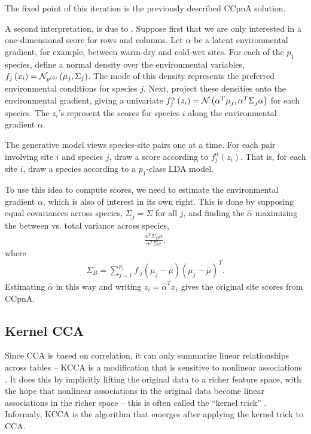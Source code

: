 \documentclass[14pt]{extarticle}
\begin{document}
The fixed point of this iteration is the previously described CCpnA solution.

A second interpretation, is due to \citep{zhu2005constrained}. Suppose first
that we are only interested in a one-dimensional score for rows and columns. Let
$\alpha$ be a latent environmental gradient, for example, between warm-dry and
cold-wet sites. For each of the $p_{1}$ species, define a normal density over
the environmental variables, $f_{j}\left(x_{i}\right) =
\mathcal{N}_{p^{(2)}}\left(\mu_{j}, \Sigma_{j}\right)$. The mode of this density
represents the preferred environmental conditions for species $j$. Next, project
these densities onto the environmental gradient, giving a univariate
$f_{j}^{\alpha}\left(z_{i}\right) = \mathcal{N}\left(\alpha^{T}\mu_{j}, \alpha^{T}
\Sigma_{j}\alpha\right)$ for each species. The $z_{i}$'s represent the scores
for species $i$ along the environmental gradient $\alpha$.

The generative model views species-site pairs one at a time. For each pair
involving site $i$ and species $j$, draw a score according to
$f_{j}^{\alpha}\left(z_{i}\right)$. That is, for each site $i$, draw a species
according to a $p_{1}$-class LDA model.

To use this idea to compute scores, we need to estimate the environmental
gradient $\alpha$, which is also of interest in its own right. This is done by
supposing equal covariances across species, $\Sigma_{j} = \Sigma$ for all $j$,
and finding the $\hat{\alpha}$ maximizing the between vs. total variance across
species,
\begin{align*}
  \frac{\alpha^{T} \Sigma_{B} \alpha}{\alpha^{T} \Sigma \alpha},
\end{align*}
where
\begin{align*}
  \Sigma_{B} = \sum_{j = 1}^{p_{1}} f_{\cdot j}\left(\mu_{j} -
    \bar{\mu}\right)\left(\mu_{j} - \bar{\mu}\right)^{T}.
\end{align*}
Estimating $\hat{\alpha}$ in this way and writing $z_{i} =
\hat{\alpha}^{T}x_{i}$ gives the original site scores from CCpnA.

\subsection{Kernel CCA}
\label{subsec:kernel_cca}

Since CCA is based on correlation, it can only summarize linear relationships
across tables -- KCCA is a modification that is sensitive to nonlinear
associations \citep{akaho2006kernel, bach2003kernel, lanckriet2004statistical}.
It does this by implicitly lifting the original data to a richer feature space,
with the hope that nonlinear associations in the original data become linear
associations in the richer space -- this is often called the ``kernel trick''
\citep{scholkopf2001kernel}. Informaly, KCCA is the algorithm that emerges after
applying the kernel trick to CCA.
\end{document}

